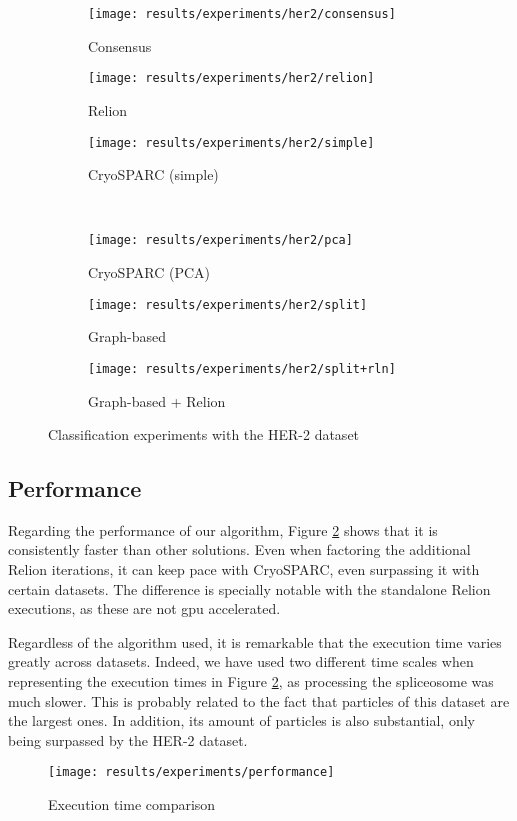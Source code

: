 \documentclass[../main.tex]{subfiles}
\begin{document}
\begin{figure}[hbp]
    \centering
    \begin{subfigure}[b]{0.3\textwidth}
         \centering
         \texttt{[image: results/experiments/her2/consensus]}
         \caption{Consensus}
    \end{subfigure}
    \begin{subfigure}[b]{0.3\textwidth}
         \centering
         \texttt{[image: results/experiments/her2/relion]}
         \caption{Relion}
    \end{subfigure}
    \begin{subfigure}[b]{0.3\textwidth}
         \centering
         \texttt{[image: results/experiments/her2/simple]}
         \caption{CryoSPARC (simple)}
    \end{subfigure}\\
    \vspace{1em}
    \begin{subfigure}[b]{0.3\textwidth}
         \centering
         \texttt{[image: results/experiments/her2/pca]}
         \caption{CryoSPARC (PCA)}
    \end{subfigure}
    \begin{subfigure}[b]{0.3\textwidth}
         \centering
         \texttt{[image: results/experiments/her2/split]}
         \caption{Graph-based}
    \end{subfigure}
    \begin{subfigure}[b]{0.3\textwidth}
         \centering
         \texttt{[image: results/experiments/her2/split+rln]}
         \caption{Graph-based + Relion}
    \end{subfigure}
    \caption{Classification experiments with the HER-2 dataset}
    \label{fig:5.2:her2_slices}
\end{figure}

\subsection{Performance}
Regarding the performance of our algorithm, Figure \ref{fig:5.2:performance} shows that it is consistently faster than other solutions. Even when factoring the additional Relion iterations, it can keep pace with CryoSPARC, even surpassing it with certain datasets. The difference is specially notable with the standalone Relion executions, as these are not \gls{gpu} accelerated.

Regardless of the algorithm used, it is remarkable that the execution time varies greatly across datasets. Indeed, we have used two different time scales when representing the execution times in Figure \ref{fig:5.2:performance}, as processing the spliceosome was much slower. This is probably related to the fact that particles of this dataset are the largest ones. In addition, its amount of particles is also substantial, only being surpassed by the HER-2 dataset.

\begin{figure}
    \centering
    \texttt{[image: results/experiments/performance]}
    \caption{Execution time comparison}
    \label{fig:5.2:performance}
\end{figure}
\end{document}
